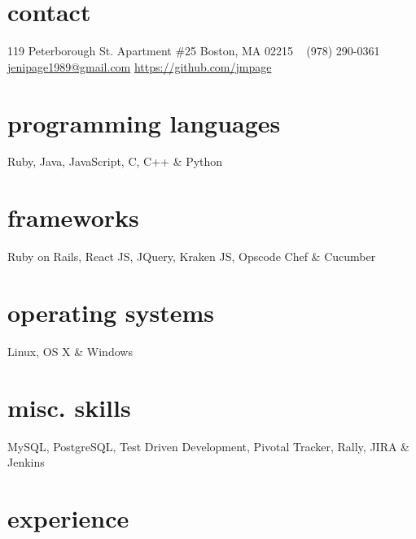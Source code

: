 \documentclass[]{friggeri-cv}
\begin{document}

\begin{aside} %
  \section{contact}
    119 Peterborough St.
    Apartment \#25
    Boston, MA 02215
    ~
    (978) 290-0361
    ~
    \hspace{-2ex}\href{mailto:jenipage1989@gmail.com}{jenipage1989@gmail.com}
    \hspace{-5ex}\href{https://github.com/jmpage}{https://github.com/jmpage}
  \section{programming languages}
    Ruby, Java,
    JavaScript, C,
    C++ \& Python
  \section{frameworks}
    Ruby on Rails,
    React JS, JQuery,
    Kraken JS,
    Opscode Chef
    \& Cucumber
  \section{operating systems}
    Linux, OS X \& Windows
  \section{misc. skills}
    MySQL, PostgreSQL,
    Test Driven Development,
    Pivotal Tracker,
    Rally, JIRA
    \& Jenkins
\end{aside}

\section{experience}
\end{document}
